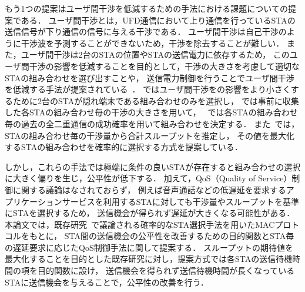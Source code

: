 \documentclass[master]{kuisthesis}		%
\begin{document}
\par
もう1つの提案はユーザ間干渉を低減するための手法における課題についての提案である．
ユーザ間干渉とは，UFD通信において上り通信を行っているSTAの送信信号が下り通信の信号に与える干渉である．
ユーザ間干渉は自己干渉のように干渉波を予測することができないため，干渉を除去することが難しい．
また，ユーザ間干渉は2台のSTAの位置やSTAの送信電力に依存するため，
このユーザ間干渉の影響を低減することを目的として，干渉の大きさを考慮して適切なSTAの組み合わせを選び出すことや，
送信電力制御を行うことでユーザ間干渉を低減する手法が提案されている~\cite{fdmac3, goyal, janus, contra, promac}．
\cite{fdmac3}ではユーザ間干渉をの影響をより小さくするために2台のSTAが隠れ端末である組み合わせのみを選択し，
\cite{goyal, janus}では事前に収集した各STAの組み合わせ毎の干渉の大きさを用いて，
~\cite{contra}では各STAの組み合わせ毎の過去の全二重通信の成功確率を用いて組み合わせを決定する．
また~\cite{promac}では，STAの組み合わせ毎の干渉量から合計スループットを推定し，
その値を最大化するSTAの組み合わせを確率的に選択する方式を提案している．
\par
しかし，これらの手法では極端に条件の良いSTAが存在すると組み合わせの選択に大きく偏りを生じ，公平性が低下する．
加えて，QoS（Quality of Service）制御に関する議論はなされておらず，
例えば音声通話などの低遅延を要求するアプリケーションサービスを利用するSTAに対しても干渉量やスループットを基準にSTAを選択するため，
送信機会が得られず遅延が大きくなる可能性がある．
本論文では，既存研究~\cite{promac}で議論される確率的なSTA選択手法を用いたMACプロトコルをもとに，
STA間の送信機会の公平性を改善するための目的関数とSTA毎の遅延要求に応じたQoS制御手法に関して提案する．
スループットの期待値を最大化することを目的とした既存研究に対し，提案方式では各STAの送信待機時間の項を目的関数に設け，
送信機会を得られず送信待機時間が長くなっているSTAに送信機会を与えることで，公平性の改善を行う．
\end{document}
